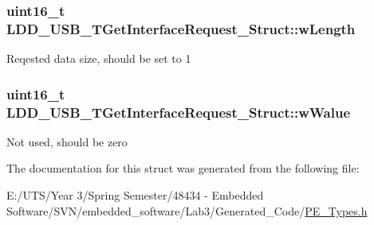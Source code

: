 \subsubsection[{w\+Length}]{\setlength{\rightskip}{0pt plus 5cm}uint16\+\_\+t L\+D\+D\+\_\+\+U\+S\+B\+\_\+\+T\+Get\+Interface\+Request\+\_\+\+Struct\+::w\+Length}\label{struct_l_d_d___u_s_b___t_get_interface_request___struct_a2aa1550fc5e72002a94c74ea0957ec74}
Reqested data size, should be set to 1 \hypertarget{struct_l_d_d___u_s_b___t_get_interface_request___struct_a48bcaf6af044e3e9669f5ea634a2b9fe}{}
\subsubsection[{w\+Walue}]{\setlength{\rightskip}{0pt plus 5cm}uint16\+\_\+t L\+D\+D\+\_\+\+U\+S\+B\+\_\+\+T\+Get\+Interface\+Request\+\_\+\+Struct\+::w\+Walue}\label{struct_l_d_d___u_s_b___t_get_interface_request___struct_a48bcaf6af044e3e9669f5ea634a2b9fe}
Not used, should be zero 

The documentation for this struct was generated from the following file\+:\begin{DoxyCompactItemize}
\item 
E\+:/\+U\+T\+S/\+Year 3/\+Spring Semester/48434 -\/ Embedded Software/\+S\+V\+N/embedded\+\_\+software/\+Lab3/\+Generated\+\_\+\+Code/\hyperlink{_p_e___types_8h}{P\+E\+\_\+\+Types.\+h}\end{DoxyCompactItemize}

